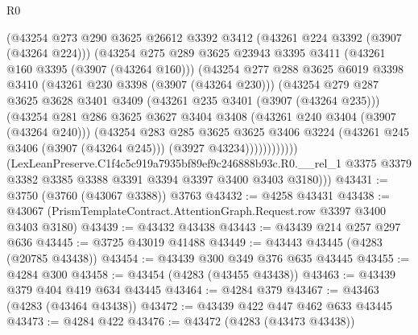 \begin{lexlean}{R0}
\begin{coremodule}
                  (@43254
                    @273
                    @290
                    @3625
                    @26612
                    @3392
                    @3412
                    (@43261 @224 @3392 (@3907 (@43264 @224)))
                    (@43254
                      @275
                      @289
                      @3625
                      @23943
                      @3395
                      @3411
                      (@43261 @160 @3395 (@3907 (@43264 @160)))
                      (@43254
                        @277
                        @288
                        @3625
                        @6019
                        @3398
                        @3410
                        (@43261 @230 @3398 (@3907 (@43264 @230)))
                        (@43254
                          @279
                          @287
                          @3625
                          @3628
                          @3401
                          @3409
                          (@43261 @235 @3401 (@3907 (@43264 @235)))
                          (@43254
                            @281
                            @286
                            @3625
                            @3627
                            @3404
                            @3408
                            (@43261 @240 @3404 (@3907 (@43264 @240)))
                            (@43254
                              @283
                              @285
                              @3625
                              @3625
                              @3406
                              @3224
                              (@43261 @245 @3406 (@3907 (@43264 @245)))
                              (@3927 @43234))))))))))))
        (LexLeanPreserve.C1f4c5c919a7935bf89ef9c246888b93c.R0.__rel_1
          @3375
          @3379
          @3382
          @3385
          @3388
          @3391
          @3394
          @3397
          @3400
          @3403
          @3180)))
@43431 := @3750 (@3760 (@43067 @3388)) @3763
@43432 := @4258 @43431
@43438 := @43067 (PrismTemplateContract.AttentionGraph.Request.row @3397 @3400 @3403 @3180)
@43439 := @43432 @43438
@43443 := @43439 @214 @257 @297 @636
@43445 := @3725 @43019 @41488
@43449 := @43443 @43445 (@4283 (@20785 @43438))
@43454 := @43439 @300 @349 @376 @635 @43445
@43455 := @4284 @300
@43458 := @43454 (@4283 (@43455 @43438))
@43463 := @43439 @379 @404 @419 @634 @43445
@43464 := @4284 @379
@43467 := @43463 (@4283 (@43464 @43438))
@43472 := @43439 @422 @447 @462 @633 @43445
@43473 := @4284 @422
@43476 := @43472 (@4283 (@43473 @43438))

\end{coremodule}
\end{lexlean}
